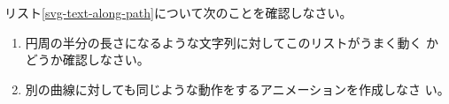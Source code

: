 \begin{Problem}\upshape
リスト\ref{svg-text-along-path}について次のことを確認しなさい。
\begin{enumerate}
 \item 円周の半分の長さになるような文字列に対してこのリストがうまく動く
 かどうか確認しなさい。
 \item 別の曲線に対しても同じような動作をするアニメーションを作成しなさ
 い。
\end{enumerate}
\end{Problem}
\iffalse%
\ShowGraphicPT{0.8}{ht}{difference-width}
    {文字が隠れています}{difference-width}
\fi
